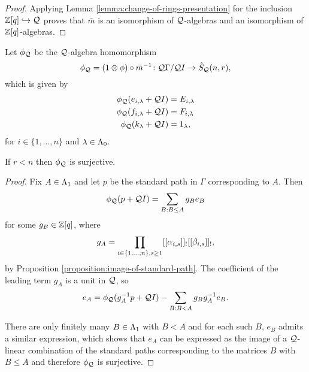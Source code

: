 \documentclass[a4paper, 11pt]{report}
\begin{document}
\begin{proof}
Applying Lemma \ref{lemma:change-of-rings-presentation} for the inclusion $\mathbb{Z}[q]\hookrightarrow\mathcal{Q}$ proves that $\bar{m}$ is an isomorphism of $\mathcal{Q}$-algebras and an isomorphism of $\mathbb{Z}[q]$-algebras.
\end{proof}

Let $\phi_{\mathcal{Q}}$ be the $\mathcal{Q}$-algebra homomorphism
\begin{equation*}
\phi_{\mathcal{Q}}=(1\otimes \phi)\circ \bar{m}^{-1}\colon \mathcal{Q}\Gamma/{\mathcal{Q} I}\to\hat{S}_{\mathcal{Q}}(n,r),
\end{equation*}
which is given by
\begin{align*}
\phi_{\mathcal{Q}}(e_{i,\lambda} +\mathcal{Q}I) &= E_{i,\lambda}\\
\phi_{\mathcal{Q}}(f_{i,\lambda} +\mathcal{Q}I) &= F_{i,\lambda}\\
\phi_{\mathcal{Q}}(k_\lambda +\mathcal{Q}I) &= 1_\lambda,
\end{align*}
for $i\in\{1,\ldots,n\}$ and $\lambda\in\Lambda_0{}$.

\begin{proposition}\label{proposition:q-schur-presentation}
If $r<n$ then $\phi_{\mathcal{Q}}$ is surjective.
\end{proposition}

\begin{proof}
Fix $A\in\Lambda_1{}$ and let $p$ be the standard path in $\Gamma$ corresponding to $A$. Then
\begin{equation*}
\phi_{\mathcal{Q}}(p+\mathcal{Q} I) = \sum_{B:B\le A} g_Be_B
\end{equation*}
for some $g_B\in\mathbb{Z}[q]$, where
\begin{equation*}
g_A = \prod_{i\in\{1,\ldots,n\},s\geq 1}[[\alpha_{i,s}]]_![[\beta_{i,s}]]_!,
\end{equation*}
by Proposition \ref{proposition:image-of-standard-path}. The coefficient of the leading term $g_A$ is a unit in $\mathcal{Q}$, so
\begin{equation*}
e_A = \phi_{\mathcal{Q}}(g_A^{-1}p+\mathcal{Q} I) - \sum_{B:B<A} g_Bg_A^{-1} e_B.
\end{equation*}

There are only finitely many $B\in\Lambda_1{}$ with $B<A$ and for each such $B$, $e_B$ admits a similar expression, which shows that $e_A$ can be expressed as the image of a $\mathcal{Q}$-linear combination of the standard paths corresponding to the matrices $B$ with $B\le A$ and therefore $\phi_{\mathcal{Q}}$ is surjective.
\end{proof}
\end{document}
